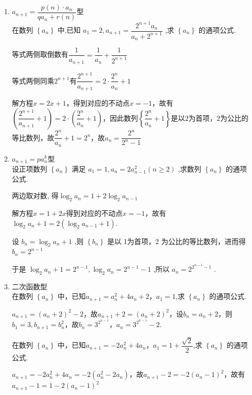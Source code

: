 \begin{enumerate}
    
    \item $a_{n+1} = \dfrac{p(n) \cdot a_n}{qa_n+r(n)}$型 \\
    在数列 $\left\{  {a}_{n}\right\}$ 中,已知 ${a}_{1} = 2,{a}_{n + 1} = \dfrac{{2}^{n + 1}{a}_{n}}{{a}_{n} + {2}^{n + 1}}$ ,求 $\left\{  {a}_{n}\right\}$ 的通项公式.
    \begin{jieda}
        等式两侧取倒数有$\dfrac{1}{a_{n+1}} = \dfrac{1}{a_n} + \dfrac{1}{2^{n+1}}$

        等式两侧同乘$2^{n+1}$有$\dfrac{2^{n+1}}{a_{n+1}} = 2 \cdot \dfrac{2^n}{a_n} + 1$

        解方程$x = 2x+1$，得到对应的不动点$x = -1$，故有$\left(\dfrac{2^{n+1}}{a_{n+1}}+1\right) = 2 \cdot \left(\dfrac{2^n}{a_n} + 1\right)$，因此数列$\left\{\dfrac{2^n}{a_n} + 1 \right\}$是以$2$为首项，$2$为公比的等比数列，故$\dfrac{2^n}{a_n} + 1 = 2^n$，故$a_n = \dfrac{2^n}{2^n - 1}$
    \end{jieda}
    
    \item $a_{n+1} = pa_n^k$型 \\
    设正项数列 $\left\{  {a}_{n}\right\}$ 满足 ${a}_{1} = 1,{a}_{n} = 2{a}_{n - 1}^{2}\left( {n \geq  2}\right)$ ,求数列 $\left\{  {a}_{n}\right\}$ 的通项公式.
    
    \begin{jieda}
        两边取对数, 得${\log }_{2}{a}_{n} = 1 + 2{\log }_{2}{a}_{n - 1}$

        解方程$x = 1+2x$得到对应的不动点$x = -1$，故有${\log }_{2}{a}_{n} + 1 = 2\left( {{\log }_{2}{a}_{n - 1} + 1}\right) .$
        
        设 ${b}_{n} = {\log }_{2}{a}_{n} + 1$ ,则 $\left\{  {b}_{n}\right\}$ 是以 1为首项，2 为公比的等比数列，进而得 ${b}_{n} = {2}^{n - 1}$
        
        于是 ${\log }_{2}{a}_{n} + 1 = {2}^{n - 1},{\log }_{2}{a}_{n} = {2}^{n - 1} - 1$ ,所以 ${a}_{n} = {2}^{{2}^{n - 1} - 1}$ .
    \end{jieda}   
    \item 二次函数型\\
    在数列 $\left\{  {a}_{n}\right\}$ 中，已知$a_{n+1} = a_n^2+4a_n+2$，$a_1 = 1$,求 $\left\{  {a}_{n}\right\}$ 的通项公式.
    \begin{jieda}
        $a_{n+1} = (a_n+2)^2-2$，故$a_{n+1}+2 = (a_n+2)^2$，设$b_n = a_n+2$，则$b_1 = 3, b_{n+1} = b_n^2$，故$b_n = 3^{2^{n-1}}$，$a_n = 3^{2^{n-1}} - 2$.
    \end{jieda}
    在数列 $\left\{  {a}_{n}\right\}$ 中，已知$a_{n+1} = -2a_n^2+4a_n$，$a_1 = 1+\dfrac{\sqrt{2}}{2}$,求 $\left\{  {a}_{n}\right\}$ 的通项公式.
    \begin{jieda}
        $a_{n+1} = -2a_n^2+4a_n = -2(a_n^2-2a_n)$，故$a_{n+1}-2 = -2(a_n-1)^2$，故有$a_{n+1} - 1 = 1 - 2(a_n-1)^2$


\end{jieda}
\end{enumerate}
